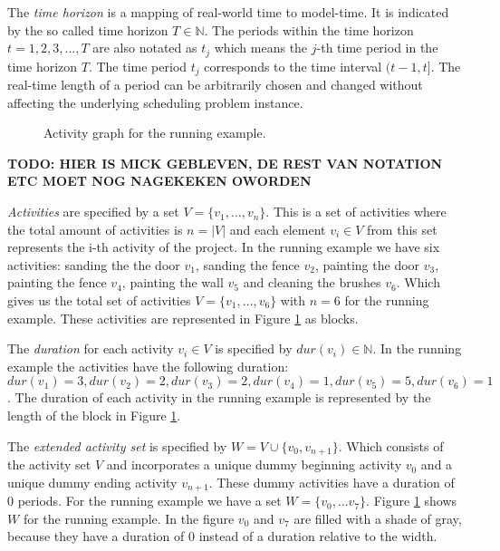\documentclass{article}
\theoremstyle{definition}
\newcommand{\inputtikz}[1]{}
\newcommand{\TODO}[1]{{\color{red}\textbf{TODO: #1}}}
\newcommand{\dur}[1]{\ensuremath{dur(v_{#1})}} %
\begin{document}
The \emph{time horizon} is a mapping of real-world time to model-time. It is indicated by the so called time horizon $T \in \mathbb{N}$.
The periods within the time horizon $t=1,2,3,\ldots,T$ are also notated as $t_j$ which means the $j$-th time period in the time horizon $T$. 
The time period $t_j$ corresponds to the time interval $(t-1,t]$. 
The real-time length of a period can be arbitrarily chosen and changed without affecting the underlying scheduling problem instance. 

\begin{figure}[ht]
	\centering
	\inputtikz{activity_graph}
	\caption{Activity graph for the running example.}
	\label{fig:activity_graph}
\end{figure}

\TODO{HIER IS MICK GEBLEVEN, DE REST VAN NOTATION ETC MOET NOG NAGEKEKEN OWORDEN}

\emph{Activities} are specified by a set $V = \{v_1, \ldots, v_n\}$.
This is a set of activities where the total amount of activities is $n = |V|$ and each element $v_i \in V$ from this set represents the i-th activity of the project.
In the running example we have six activities: sanding the the door $v_1$, sanding the fence $v_2$,  painting the door $v_3$, painting the fence $v_4$, painting the wall $v_5$ and cleaning the brushes $v_6$. 
Which gives us the total set of activities $V = \{v_1, \ldots, v_6\}$ with $n = 6$ for the running example.
These activities are represented in Figure \ref{fig:activity_graph} as blocks.

The \emph{duration} for each activity $v_i \in V$ is specified by $\dur{i} \in \mathbb{N}$.
In the running example the activities have the following duration: $\dur{1} = 3, \dur{2} = 2, \dur{3} = 2, \dur{4} = 1, \dur{5} = 5, \dur{6} = 1$. 
The duration of each activity in the running example is represented by the length of the block in Figure \ref{fig:activity_graph}.

The \emph{extended activity set} is specified by $W = V \cup \{v_0, v_{n+1}\}$.
Which consists of the activity set $V$ and incorporates a unique dummy beginning activity $v_0$ and a unique dummy ending activity $v_{n+1}$. 
These dummy activities have a duration of $0$ periods.
For the running example we have a set $W = \{v_0, \ldots v_7\}$.
Figure \ref{fig:activity_graph} shows $W$ for the running example.
In the figure $v_0$ and $v_7$ are filled with a shade of gray, because they have a duration of $0$ instead of a duration relative to the width. 
\end{document}
